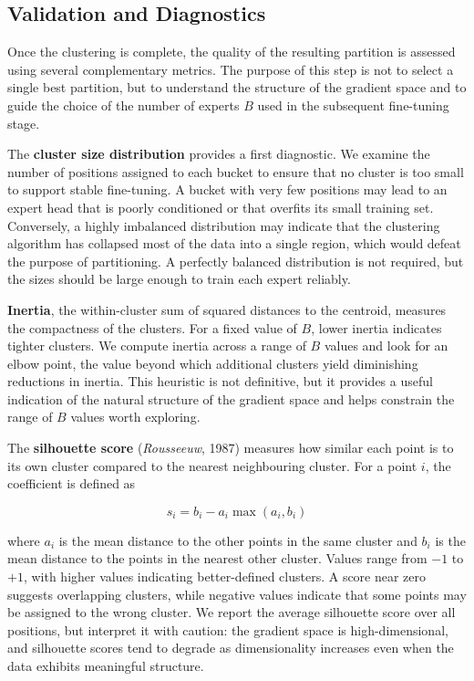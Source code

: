 \subsection{Validation and Diagnostics}

Once the clustering is complete, the quality of the resulting partition is assessed using several complementary metrics. The purpose of this step is not to select a single best partition, but to understand the structure of the gradient space and to guide the choice of the number of experts $B$ used in the subsequent fine-tuning stage.

The \textbf{cluster size distribution} provides a first diagnostic. We examine the number of positions assigned to each bucket to ensure that no cluster is too small to support stable fine-tuning. A bucket with very few positions may lead to an expert head that is poorly conditioned or that overfits its small training set. Conversely, a highly imbalanced distribution may indicate that the clustering algorithm has collapsed most of the data into a single region, which would defeat the purpose of partitioning. A perfectly balanced distribution is not required, but the sizes should be large enough to train each expert reliably.

\textbf{Inertia}, the within-cluster sum of squared distances to the centroid, measures the compactness of the clusters. For a fixed value of $B$, lower inertia indicates tighter clusters. We compute inertia across a range of $B$ values and look for an elbow point, the value beyond which additional clusters yield diminishing reductions in inertia. This heuristic is not definitive, but it provides a useful indication of the natural structure of the gradient space and helps constrain the range of $B$ values worth exploring.


The \textbf{silhouette score} (\emph{Rousseeuw}, 1987) measures how similar each point is to its own cluster compared to the nearest neighbouring cluster. For a point $i$, the coefficient is defined as

\[s_i=b_i−a_i \max⁡(a_i,b_i)\]

where $a_i$ is the mean distance to the other points in the same cluster and $b_i$ is the mean distance to the points in the nearest other cluster. Values range from $-1$ to $+1$, with higher values indicating better-defined clusters. A score near zero suggests overlapping clusters, while negative values indicate that some points may be assigned to the wrong cluster. We report the average silhouette score over all positions, but interpret it with caution: the gradient space is high-dimensional, and silhouette scores tend to degrade as dimensionality increases even when the data exhibits meaningful structure.

